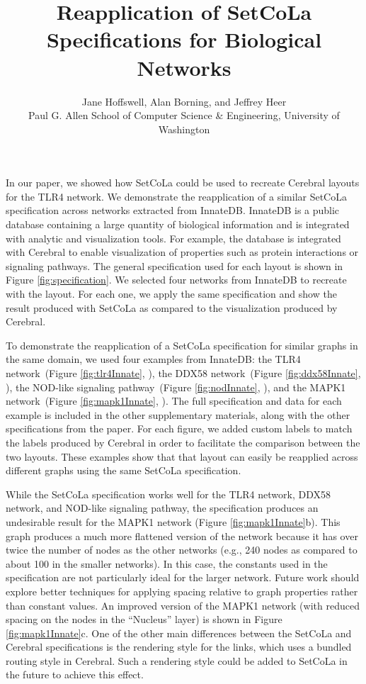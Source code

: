 \documentclass{egpubl}
\title[Reapplication of SetCoLa Specifications for Biological Networks]%
{
  Reapplication of SetCoLa Specifications for Biological Networks
  \vspace{-20pt}
}
\author[Jane Hoffswell, Alan Borning, and Jeffrey Heer]
{
  Jane Hoffswell,
  Alan Borning,
  and Jeffrey Heer
  \\\vspace{-10pt}
  Paul G. Allen School of Computer Science \& Engineering, University of Washington
}
\begin{document}
\maketitle

In our paper, we showed how SetCoLa could be used to recreate Cerebral 
layouts for the TLR4 network. We demonstrate 
the reapplication of a similar SetCoLa specification across networks 
extracted from InnateDB. InnateDB \cite{breuer2012innatedb} is a public 
database containing a large quantity of biological information and is 
integrated with analytic and visualization tools. For example, the database 
is integrated with Cerebral \cite{barsky2008cerebral} to enable visualization 
of properties such as protein interactions or signaling pathways. The 
general specification used for each layout is shown in Figure \ref{fig:specification}.
We selected four networks from InnateDB to recreate with the layout. For 
each one, we apply the same specification and show the result produced with
SetCoLa as compared to the visualization produced by Cerebral.

To demonstrate the reapplication of a SetCoLa specification for similar
graphs in the same domain, we used four examples from InnateDB: 
the TLR4 network~(Figure \ref{fig:tlr4Innate}, \cite{innatedb:tlr4}), 
the DDX58 network~(Figure \ref{fig:ddx58Innate}, \cite{innatedb:ddx58}), 
the NOD-like signaling pathway~(Figure \ref{fig:nodInnate}, \cite{innatedb:nod}), 
and the MAPK1 network~(Figure \ref{fig:mapk1Innate}, \cite{innatedb:mapk1}).
The full specification and data for each example is included in the other 
supplementary materials, along with the other specifications from the paper.
For each figure, we added custom labels to match the labels produced by
Cerebral in order to facilitate the comparison between the two layouts.
These examples show that that layout can easily be reapplied across
different graphs using the same SetCoLa specification. 

While the SetCoLa specification works well for the TLR4 network, DDX58 
network, and NOD-like signaling pathway, the specification produces an 
undesirable result for the MAPK1 network (Figure \ref{fig:mapk1Innate}b). 
This graph produces a much more flattened version of the network because 
it has over twice the number of nodes as the other networks (e.g., 240 
nodes as compared to about 100 in the smaller networks). In this case, 
the constants used in the specification are not particularly ideal for 
the larger network. Future work should explore better techniques for 
applying spacing relative to graph properties rather than constant 
values. An improved version of the MAPK1 network (with reduced spacing 
on the nodes in the ``Nucleus'' layer) is shown in Figure \ref{fig:mapk1Innate}c.
One of the other main differences between the SetCoLa and Cerebral specifications is
the rendering style for the links, which uses a bundled routing style in Cerebral.
Such a rendering style could be added to SetCoLa in the future to achieve this effect.
\\
\\
\end{document}
